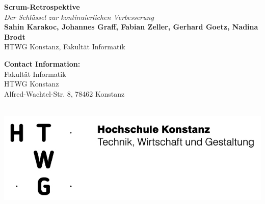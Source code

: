 \documentclass[a0,landscape]{a0poster}
\begin{document}


\begin{minipage}[b]{0.55\linewidth}
    \huge \color{NavyBlue} \textbf{Scrum-Retrospektive} \color{Black}\\ %
    \huge\textit{Der Schlüssel zur kontinuierlichen Verbesserung}\\[1cm] %
    \huge \textbf{Sahin Karakoc, Johannes Graff, Fabian Zeller, Gerhard Goetz, Nadina Brodt}\\ %
    \huge HTWG Konstanz, Fakultät Informatik\\ %
\end{minipage}
%
\begin{minipage}[b]{0.25\linewidth}
    \color{DarkSlateGray}\Large \textbf{Contact Information:}\\
    Fakultät Informatik\\ %
    HTWG Konstanz\\
    Alfred-Wachtel-Str. 8, 78462 Konstanz\\\\
\end{minipage}
%
\begin{minipage}[b]{0.19\linewidth}
    \includegraphics[width=20cm]{logo200.jpg} %
\end{minipage}
\end{document}
